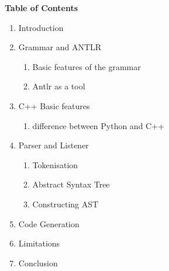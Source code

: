 \documentclass[11pt]{article}
\begin{document}
\newpage
\begin{center}
\huge \bfseries Table of Contents\par
\end{center}
\begin{enumerate}
  \item Introduction 
  \item Grammar and ANTLR 
  \begin{enumerate}
  \item Basic features of the grammar 
  \item Antlr as a tool 
  \end{enumerate}
  \item C++ Basic features 
  \begin{enumerate}
      \item difference between Python and C++ 
  \end{enumerate}
  \item Parser and Listener 
  \begin{enumerate}
        \item Tokenisation 
        \item Abstract Syntax Tree 
        \item Constructing AST 
  \end{enumerate}
  \item Code Generation 
  \item Limitations 
  \item Conclusion 
\end{enumerate}
\end{document}
